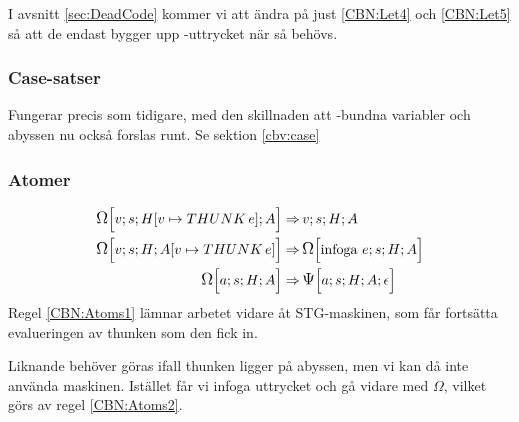 \documentclass[../Optimise]{subfiles}
\begin{document}
I avsnitt \ref{sec:DeadCode} kommer vi att ändra på just \eqref{CBN:Let4} 
och \eqref{CBN:Let5} så att de endast bygger upp -uttrycket när så behövs.





\subsubsection{Case-satser}
Fungerar precis som tidigare, med den skillnaden att -bundna variabler 
och abyssen nu också forslas runt. Se sektion \ref{cbv:case}

\subsubsection{Atomer}
\begin{align}
\label{CBN:Atoms1}\CBNOMEGA s{\heap v{\THUNK e}}Av \Rightarrow &\, \CBNMC vsHA\\
\label{CBN:Atoms2}\CBNOMEGA sH{\abyss v{\THUNK e}}v  \Rightarrow &\, \CBNOMEGA sHA{\text{infoga }e}\\
\label{CBN:Atoms3}\CBNOMEGA sHAa \Rightarrow &\, \CBNPSI sHA{\epsilon}a
\end{align}
Regel \eqref{CBN:Atoms1} lämnar arbetet vidare åt STG-maskinen, som får fortsätta
evalueringen av thunken som den fick in.

Liknande behöver göras ifall thunken ligger på abyssen, men vi kan då inte använda maskinen.
Istället får vi infoga uttrycket och gå vidare med $\Omega$, vilket görs av regel \eqref{CBN:Atoms2}. 
\end{document}
